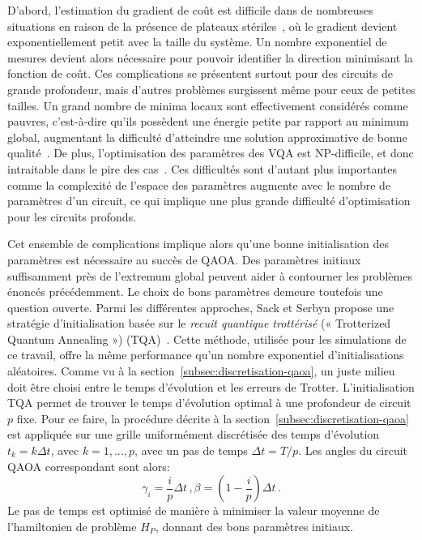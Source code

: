 D'abord, l'estimation du gradient de coût est difficile dans de nombreuses situations en raison de la présence de plateaux stériles~\cite{mccleanBarrenPlateausQuantum2018, laroccaReviewBarrenPlateaus2024}, où le gradient devient exponentiellement petit avec la taille du système. Un nombre exponentiel de mesures devient alors nécessaire pour pouvoir identifier la direction minimisant la fonction de coût. Ces complications se présentent surtout pour des circuits de grande profondeur, mais d'autres problèmes surgissent même pour ceux de petites tailles. Un grand nombre de minima locaux sont effectivement considérés comme pauvres, c'est-à-dire qu'ils possèdent une énergie petite par rapport au minimum global, augmentant la difficulté d'atteindre une solution approximative de bonne qualité~\cite{anschuetzQuantumVariationalAlgorithms2022}. De plus, l'optimisation des paramètres des VQA est \textsf{NP}-difficile, et donc intraitable dans le pire des cas~\cite{bittelTrainingVariationalQuantum2021}. Ces difficultés sont d'autant plus importantes comme la complexité de l'espace des paramètres augmente avec le nombre de paramètres d'un circuit, ce qui implique une plus grande difficulté d'optimisation pour les circuits profonds. 

Cet ensemble de complications implique alors qu'une bonne initialisation des paramètres est nécessaire au succès de QAOA. Des paramètres initiaux suffisamment près de l'extremum global peuvent aider à contourner les problèmes énoncés précédemment. Le choix de bons paramètres demeure toutefois une question ouverte. Parmi les différentes approches, Sack et Serbyn propose une stratégie d'initialisation basée sur le \textit{recuit quantique trottérisé} (« Trotterized Quantum Annealing ») (TQA)~\cite{sackQuantumAnnealingInitialization2021}. Cette méthode, utilisée pour les simulations de ce travail, offre la même performance qu'un nombre exponentiel d'initialisations aléatoires. Comme vu à la section~\ref{subsec:discretisation-qaoa}, un juste milieu doit être choisi entre le temps d'évolution et les erreurs de Trotter. L'initialisation TQA permet de trouver le temps d'évolution optimal à une profondeur de circuit $p$ fixe. Pour ce faire, la procédure décrite à la section~\ref{subsec:discretisation-qaoa} est appliquée sur une grille uniformément discrétisée des temps d'évolution $t_{k} = k \Delta t$, avec $k = 1,\dots, p$, avec un pas de temps $\Delta t = T / p$. Les angles du circuit QAOA correspondant sont alors:
\begin{equation}
    \gamma_{i} = \frac{i}{p} \Delta t \,, \beta = (1 - \frac{i}{p}) \Delta t \,.
\end{equation}
Le pas de temps est optimisé de manière à minimiser la valeur moyenne de l'hamiltonien de problème $H_{P}$, donnant des bons paramètres initiaux.

